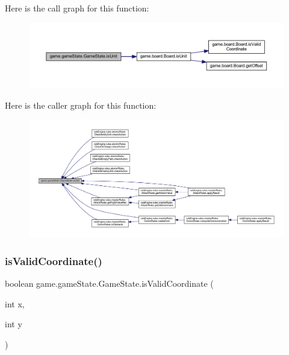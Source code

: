Here is the call graph for this function\+:
\nopagebreak
\begin{figure}[H]
\begin{center}
\leavevmode
\includegraphics[width=350pt]{classgame_1_1game_state_1_1_game_state_aa00899823d9599e053902598707f2bae_cgraph}
\end{center}
\end{figure}
Here is the caller graph for this function\+:
\nopagebreak
\begin{figure}[H]
\begin{center}
\leavevmode
\includegraphics[width=350pt]{classgame_1_1game_state_1_1_game_state_aa00899823d9599e053902598707f2bae_icgraph}
\end{center}
\end{figure}
\mbox{\label{classgame_1_1game_state_1_1_game_state_aa60313a4c02762b0b05c5474cb3a987f}} 
\subsubsection{\texorpdfstring{is\+Valid\+Coordinate()}{isValidCoordinate()}}
{\footnotesize\ttfamily boolean game.\+game\+State.\+Game\+State.\+is\+Valid\+Coordinate (\begin{DoxyParamCaption}\item[{int}]{x,  }\item[{int}]{y }\end{DoxyParamCaption})\hspace{0.3cm}{\ttfamily [inline]}}


